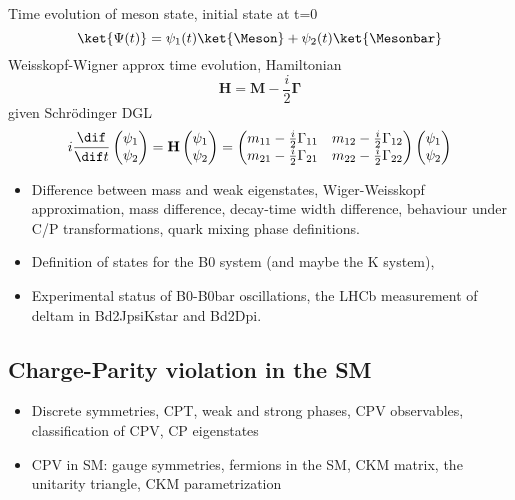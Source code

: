 Time evolution of meson state, initial state at t=0
%
\begin{equation}
  \ket{\Psi(t)} = \psi_1(t) \ket{\Meson} + \psi_2(t) \ket{\Mesonbar}
\end{equation}
%
Weisskopf-Wigner approx time evolution, Hamiltonian
%
\begin{equation}
  \mathbf{H} = \mathbf{M} - \frac{i}{2} \mathbf{\Gamma}
\end{equation}
%
given Schrödinger DGL
%
\begin{equation}
  i \frac{\dif}{\dif t} 
  \begin{pmatrix}
    \psi_1 \\
    \psi_2
  \end{pmatrix}
  =
  \mathbf{H}
  \begin{pmatrix}
    \psi_1 \\
    \psi_2
  \end{pmatrix}
  =
  \begin{pmatrix}
    m_{11} - \frac{i}{2} \Gamma_{11}    & m_{12} - \frac{i}{2} \Gamma_{12} \\
    m_{21} - \frac{i}{2} \Gamma_{21}    & m_{22} - \frac{i}{2} \Gamma_{22} \\
  \end{pmatrix}
  \begin{pmatrix}
    \psi_1 \\
    \psi_2
  \end{pmatrix}
\end{equation}

\clearpage
\begin{itemize}
  \item Difference between mass and weak eigenstates, Wiger-Weisskopf approximation, mass difference, decay-time width difference, behaviour under C/P transformations, quark mixing phase definitions.
  \item Definition of states for the B0 system (and maybe the K system), 
  \item Experimental status of B0-B0bar oscillations, the LHCb measurement of deltam in Bd2JpsiKstar and Bd2Dpi.
\end{itemize}

\subsection{Charge-Parity violation in the SM}
\begin{itemize}
  \item Discrete symmetries, CPT, weak and strong phases, CPV observables, classification of CPV, CP eigenstates
  \item CPV in SM: gauge symmetries, fermions in the SM, CKM matrix, the unitarity triangle, CKM parametrization
\end{itemize}


